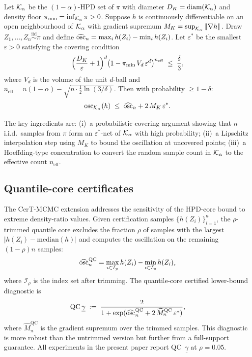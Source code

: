 \begin{theorem}
\label{thm:lcnf_restated}
  Let $\mathcal{K}_\alpha$ be the $(1{-}\alpha)$-HPD set of $\pi$
  with diameter $D_K = \mathrm{diam}(\mathcal{K}_\alpha)$ and density floor
  $\pi_{\min} = \inf_{\mathcal{K}_\alpha}\pi > 0$.
  Suppose $h$ is continuously differentiable on an open
  neighbourhood of $\mathcal{K}_\alpha$ with gradient supremum
  $M_K = \sup_{\mathcal{K}_\alpha}\|\nabla h\|$.
  Draw $Z_1, \ldots, Z_n \stackrel{\mathrm{iid}}{\sim} \pi$
  and define $\widehat{\mathrm{osc}}_n = \max_i h(Z_i) - \min_i h(Z_i)$.
  Let $\varepsilon^*$ be the smallest $\varepsilon > 0$
  satisfying the covering condition
  \begin{equation}\label{eq:covering_restated}
    \Bigl(\frac{D_K}{\varepsilon} + 1\Bigr)^d
    \bigl(1 - \pi_{\min}\,V_d\,\varepsilon^d\bigr)^{n_{\mathrm{eff}}}
    \;\leq\; \frac{\delta}{3},
  \end{equation}
  where $V_d$ is the volume of the unit $d$-ball and
  $n_{\mathrm{eff}} = n(1{-}\alpha)
  - \sqrt{n \cdot \tfrac{1}{2}\ln(3/\delta)}$.
  Then with probability $\geq 1 - \delta$:
  \[
    \mathrm{osc}_{\mathcal{K}_\alpha}(h) \;\leq\;
    \widehat{\mathrm{osc}}_n + 2\,M_K\,\varepsilon^*.
  \]
\end{theorem}

The key ingredients are:
(i)~a probabilistic covering argument showing that $n$
i.i.d.\ samples from $\pi$ form an $\varepsilon^*$-net of
$\mathcal{K}_\alpha$ with high probability;
(ii)~a Lipschitz interpolation step using $M_K$ to bound
the oscillation at uncovered points;
(iii)~a Hoeffding-type concentration to convert the random
sample count in $\mathcal{K}_\alpha$ to the effective count
$n_{\mathrm{eff}}$.


\subsection{Quantile-core certificates}
\label{app:toolkit_qc}

The CerT-MCMC extension \citep{CerTMCMC} addresses the
sensitivity of the HPD-core bound to extreme density-ratio
values.  Given certification samples
$\{h(Z_i)\}_{i=1}^n$, the $\rho$-trimmed quantile core
excludes the fraction $\rho$ of samples with the largest
$|h(Z_i) - \mathrm{median}(h)|$ and computes the oscillation
on the remaining $(1{-}\rho)n$ samples:
\[
  \widehat{\mathrm{osc}}_n^{\mathrm{QC}}
  = \max_{i \in \mathcal{I}_\rho} h(Z_i)
  - \min_{i \in \mathcal{I}_\rho} h(Z_i),
\]
where $\mathcal{I}_\rho$ is the index set after trimming.
The quantile-core certified lower-bound diagnostic is
\[
  \mathrm{QC}\,\underline{\gamma}
  \;:=\; \frac{2}{1 + \exp(\widehat{\mathrm{osc}}_n^{\mathrm{QC}}
  + 2\,\widehat{M}_n^{\mathrm{QC}}\,\varepsilon^*)},
\]
where $\widehat{M}_n^{\mathrm{QC}}$ is the gradient
supremum over the trimmed samples.  This diagnostic is more
robust than the untrimmed version but further from a
full-support guarantee.  All experiments in the present
paper report QC~$\underline{\gamma}$ at $\rho = 0.05$.


